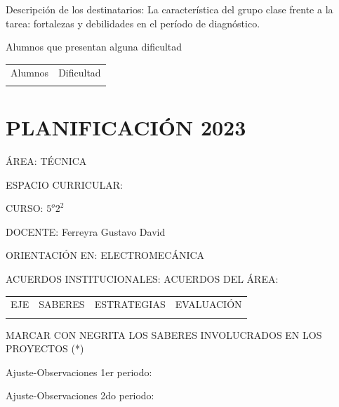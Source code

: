 \documentclass[../main]{subfiles}
\begin{document}
 

Descripción de los destinatarios: La característica del grupo clase frente a la tarea: fortalezas y debilidades en el período de diagnóstico. 

 

Alumnos que presentan alguna dificultad 

 \begin{table}[h]
     \centering
     \begin{tabular}{|c|c|}
         Alumnos & Dificultad \\
          & 
     \end{tabular}
   \end{table}


\section{PLANIFICACIÓN 2023}

ÁREA: TÉCNICA  

ESPACIO CURRICULAR:  

CURSO: $5^o 2^2$ 

DOCENTE: Ferreyra Gustavo David

ORIENTACIÓN EN: ELECTROMECÁNICA

ACUERDOS INSTITUCIONALES: 
ACUERDOS DEL ÁREA: 

\begin{table}[h]
    \centering
    \begin{longtable}{|c|c|c|c|}
        EJE & SABERES & ESTRATEGIAS & EVALUACIÓN\\
         & & & \\
    \end{longtable}
\end{table}


MARCAR CON NEGRITA LOS SABERES INVOLUCRADOS EN LOS PROYECTOS (*) 

 

Ajuste-Observaciones 1er periodo: 

Ajuste-Observaciones 2do periodo: 
\end{document}
